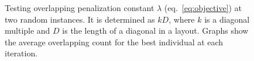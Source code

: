 \begin{figure}
    \centering

    \caption[Testing overlapping penalization constant]
    {Testing overlapping penalization constant $\lambda$ (eq.~\ref{eq:objective}) at two random instances.
    It is determined as $kD$, where $k$ is a diagonal multiple and $D$ is the length of a diagonal in a layout.
    Graphs show the average overlapping count for the best individual at each iteration.}
    \label{fig:hyperparameters-overlapping-penalization-constant}%
\end{figure}


